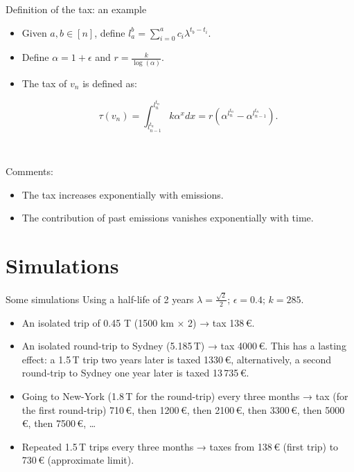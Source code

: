 \documentclass[french, english]{beamer}
\begin{document}
\begin{frame}{Definition of the tax: an example}
    \begin{itemize}
    \item Given $a,b \in [n]$, define $l_a^{b} = \sum_{i = 0}^a c_i \lambda^{t_b - t_i}$.
    \item Define $\alpha = 1 + \epsilon$ and $r = \frac{k}{\log(\alpha)}$.
    \item The tax of $v_n$ is defined as: \begin{tcolorbox}$$ \tau(v_n) = \int_{l_{n-1}^{t_n}}^{l_n^{t_n}} k \alpha^x dx = r (\alpha^{l_n^{t_n}} - \alpha^{l_{n - 1}^{t_n}}).$$\end{tcolorbox}
    \end{itemize}	
    
    \

   Comments:
   \begin{itemize}
   \item The tax increases exponentially with emissions.
   \item The contribution of past emissions vanishes exponentially with time.
   \end{itemize}

\end{frame}

\section{Simulations}
\begin{frame}{Some simulations}
    Using a half-life of 2 years $\lambda = \frac{\sqrt{2}}{2}$; $\epsilon = 0.4$; $k = 285$.
    \begin{itemize}
    	\item An isolated trip of 0.45 T (1500 km × 2) → tax 138\,€.
	\item An isolated round-trip to Sydney (5.185\,T) → tax 4000\,€. This has a lasting effect: a 1.5\,T trip two years later is taxed 1330\,€, alternatively, a second round-trip to Sydney one year later is taxed 13\,735\,€.
	\item Going to New-York (1.8\,T for the round-trip) every three months → tax (for the first round-trip) 710\,€, then 1200\,€, then 2100\,€, then 3300\,€, then 5000\,€, then 7500\,€, …
	\item Repeated 1.5\,T trips every three months → taxes from 138\,€ (first trip) to 730\,€ (approximate limit).
	\end{itemize}
\end{frame}
\end{document}
